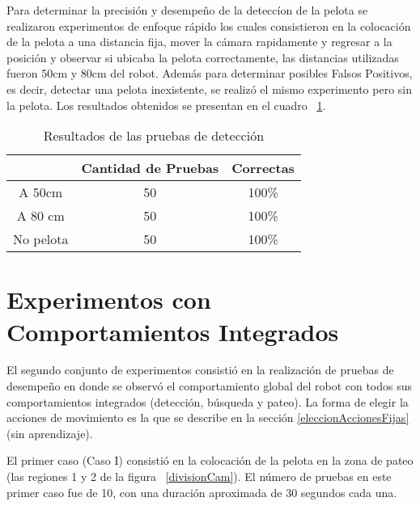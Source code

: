 Para determinar la precisi\'on y desempe\~no de la detecc\'ion de la pelota se realizaron experimentos de enfoque r\'apido los cuales consistieron en la colocaci\'on de la pelota a una distancia fija, mover la c\'amara rapidamente y regresar a la posici\'on y observar si ubicaba la pelota correctamente, las distancias utilizadas fueron 50cm y 80cm del robot. Adem\'as para determinar posibles Falsos Positivos, es decir, detectar una pelota inexistente, se realiz\'o el mismo experimento pero sin la pelota. Los resultados obtenidos se presentan en el cuadro ~\ref{fig:deteccion}.

\begin{table}
\centering
\begin{tabular}{c c c}
 \hline 
  & Cantidad de Pruebas & Correctas \\ 
 \hline 
 A 50cm & 50 & 100\% \\ 
 A 80 cm & 50 & 100\% \\ 
 No pelota & 50 & 100\% \\ 
  \hline 

 \end{tabular}  
\caption{Resultados de las pruebas de detecci\'on}
\label{fig:deteccion} 

\end{table}

\section{Experimentos con Comportamientos Integrados}
\label{sec:experimentosintegrados}

El segundo conjunto de experimentos consistió en la realización de pruebas de desempeño en donde se observó el comportamiento global del robot con todos sus comportamientos integrados (detección, búsqueda y pateo). La forma de elegir la acciones de movimiento es la que se describe en la sección \ref{eleccionAccionesFijas} (sin aprendizaje). 

El  primer caso (Caso I) consistió en la colocación de la pelota en la zona de pateo (las regiones 1 y 2 de la figura ~\ref{divisionCam}). El número de pruebas en este primer caso fue de 10, con una duración aproximada de 30 segundos cada una.

